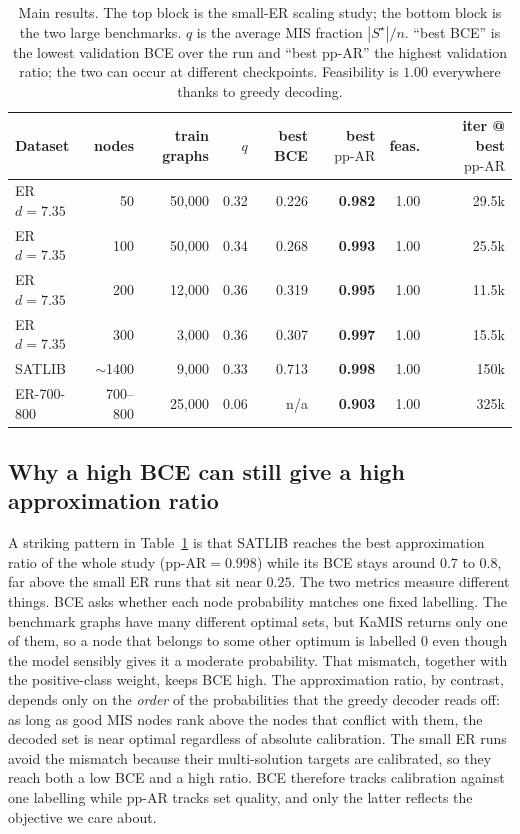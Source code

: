 \documentclass[10pt,a4paper]{article}
\newcommand{\ppar}{\mathrm{pp\text{-}AR}}
\begin{document}
\begin{table}[h]
\centering
\small
\caption{Main results. The top block is the small-ER scaling study; the bottom
block is the two large benchmarks. $q$ is the average MIS fraction $|S^\star|/n$.
``best BCE'' is the lowest validation BCE over the run and ``best $\ppar$'' the
highest validation ratio; the two can occur at different checkpoints. Feasibility
is $1.00$ everywhere thanks to greedy decoding.}
\label{tab:main}
\begin{tabular}{lrrrrrrr}
\toprule
Dataset & nodes & train graphs & $q$ & best BCE & best $\ppar$ & feas. & iter @ best $\ppar$\\
\midrule
ER $d{=}7.35$ & 50  & 50{,}000 & 0.32 & 0.226 & \textbf{0.982} & 1.00 & 29.5k \\
ER $d{=}7.35$ & 100 & 50{,}000 & 0.34 & 0.268 & \textbf{0.993} & 1.00 & 25.5k \\
ER $d{=}7.35$ & 200 & 12{,}000 & 0.36 & 0.319 & \textbf{0.995} & 1.00 & 11.5k \\
ER $d{=}7.35$ & 300 & \phantom{0}3{,}000 & 0.36 & 0.307 & \textbf{0.997} & 1.00 & 15.5k \\
\midrule
SATLIB        & $\sim$1400 & 9{,}000 & 0.33 & 0.713 & \textbf{0.998} & 1.00 & 150k \\
ER-700-800    & 700--800   & 25{,}000 & 0.06 & n/a   & \textbf{0.903} & 1.00 & 325k \\
\bottomrule
\end{tabular}
\end{table}

\subsection{Why a high BCE can still give a high approximation ratio}

A striking pattern in Table~\ref{tab:main} is that SATLIB reaches the best
approximation ratio of the whole study ($\ppar=0.998$) while its BCE stays around
$0.7$ to $0.8$, far above the small ER runs that sit near $0.25$. The two metrics
measure different things. BCE asks whether each node probability matches one fixed
labelling. The benchmark graphs have many different optimal sets, but KaMIS returns
only one of them, so a node that belongs to some other optimum is labelled $0$ even
though the model sensibly gives it a moderate probability. That mismatch, together
with the positive-class weight, keeps BCE high. The approximation ratio, by
contrast, depends only on the \emph{order} of the probabilities that the greedy
decoder reads off: as long as good MIS nodes rank above the nodes that conflict
with them, the decoded set is near optimal regardless of absolute calibration. The
small ER runs avoid the mismatch because their multi-solution targets are
calibrated, so they reach both a low BCE and a high ratio. BCE therefore tracks
calibration against one labelling while $\ppar$ tracks set quality, and only the
latter reflects the objective we care about.
\end{document}
